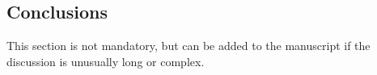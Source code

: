 \begin{paracol}{2}




\section{Conclusions}

This section is not mandatory, but can be added to the manuscript if the discussion is unusually long or complex.

\end{paracol}




